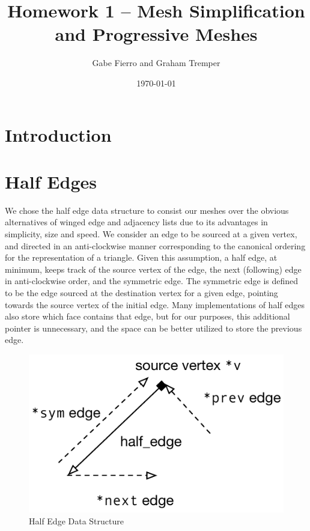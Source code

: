 \documentclass[11pt]{article}
\begin{document}
\title{Homework 1 -- Mesh Simplification and Progressive Meshes}
\author{Gabe Fierro and Graham Tremper}
\date{\today}
\maketitle

\section{Introduction}

\section{Half Edges}

We chose the half edge data structure to consist our meshes over the obvious
alternatives of winged edge and adjacency lists due to its advantages in
simplicity, size and speed. We consider an edge to be sourced at a given
vertex, and directed in an anti-clockwise manner corresponding to the canonical
ordering for the representation of a triangle. Given this assumption, a half
edge, at minimum, keeps track of the source vertex of the edge, the next
(following) edge in anti-clockwise order, and the symmetric edge. The symmetric
edge is defined to be the edge sourced at the destination vertex for a given
edge, pointing towards the source vertex of the initial edge. Many
implementations of half edges also store which face contains that edge, but for
our purposes, this additional pointer is unnecessary, and the space can be
better utilized to store the previous edge.

\begin{figure}[htb]
\begin{center}
  \includegraphics{figs/half_edge-data-structure}
\end{center}
\caption{Half Edge Data Structure}
\end{figure}
\end{document}
